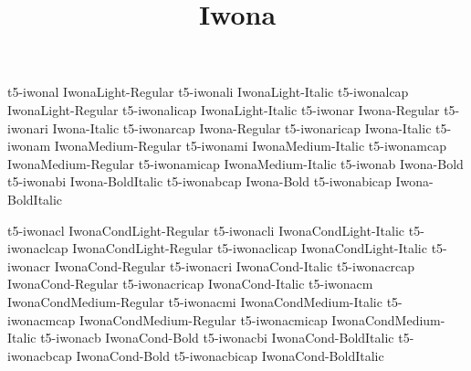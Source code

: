 \documentclass[test]{vnsample}
\title{Iwona}
\begin{document}
\begin{shortsample}
      {t5-iwonal}      {IwonaLight-Regular}
     {t5-iwonali}     {IwonaLight-Italic}
     {t5-iwonalcap}   {IwonaLight-Regular}
   {t5-iwonalicap}  {IwonaLight-Italic}
      {t5-iwonar}      {Iwona-Regular}
     {t5-iwonari}     {Iwona-Italic}
     {t5-iwonarcap}   {Iwona-Regular}
   {t5-iwonaricap}  {Iwona-Italic}
     {t5-iwonam}      {IwonaMedium-Regular}
    {t5-iwonami}     {IwonaMedium-Italic}
    {t5-iwonamcap}   {IwonaMedium-Regular}
  {t5-iwonamicap}  {IwonaMedium-Italic}
      {t5-iwonab}      {Iwona-Bold}
     {t5-iwonabi}     {Iwona-BoldItalic}
     {t5-iwonabcap}   {Iwona-Bold}
   {t5-iwonabicap}  {Iwona-BoldItalic}
\end{shortsample}
\clearpage
\begin{shortsample}
     {t5-iwonacl}     {IwonaCondLight-Regular}
    {t5-iwonacli}    {IwonaCondLight-Italic}
    {t5-iwonaclcap}  {IwonaCondLight-Regular}
  {t5-iwonaclicap} {IwonaCondLight-Italic}
     {t5-iwonacr}     {IwonaCond-Regular}
    {t5-iwonacri}    {IwonaCond-Italic}
    {t5-iwonacrcap}  {IwonaCond-Regular}
  {t5-iwonacricap} {IwonaCond-Italic}
    {t5-iwonacm}     {IwonaCondMedium-Regular}
   {t5-iwonacmi}    {IwonaCondMedium-Italic}
   {t5-iwonacmcap}  {IwonaCondMedium-Regular}
 {t5-iwonacmicap} {IwonaCondMedium-Italic}
     {t5-iwonacb}     {IwonaCond-Bold}
    {t5-iwonacbi}    {IwonaCond-BoldItalic}
    {t5-iwonacbcap}  {IwonaCond-Bold}
  {t5-iwonacbicap} {IwonaCond-BoldItalic}
\end{shortsample}
\end{document}

